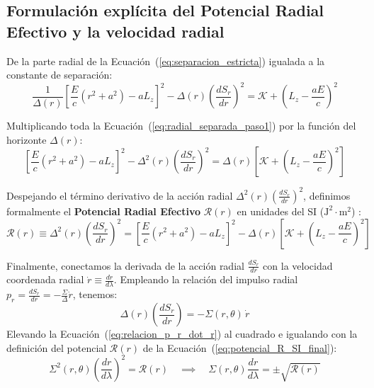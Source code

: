 \subsection{Formulación explícita del Potencial Radial Efectivo y la velocidad radial}

De la parte radial de la Ecuación~(\ref{eq:separacion_estricta}) igualada a la constante de separación:
\begin{equation}
    \frac{1}{\Delta(r)} \left[ \frac{E}{c}(r^2+a^2) - a L_z \right]^2 - \Delta(r) \left(\frac{dS_r}{dr}\right)^2 = \mathcal{K} + \left(L_z - \frac{a E}{c}\right)^2
    \label{eq:radial_separada_paso1}
\end{equation}

Multiplicando toda la Ecuación~(\ref{eq:radial_separada_paso1}) por la función del horizonte $\Delta(r)$:
\begin{equation}
    \left[ \frac{E}{c}(r^2+a^2) - a L_z \right]^2 - \Delta^2(r) \left(\frac{dS_r}{dr}\right)^2 = \Delta(r) \left[ \mathcal{K} + \left(L_z - \frac{a E}{c}\right)^2 \right]
    \label{eq:radial_separada_paso2}
\end{equation}

Despejando el término derivativo de la acción radial $\Delta^2(r) \left(\frac{dS_r}{dr}\right)^2$, definimos formalmente el \textbf{Potencial Radial Efectivo} $\mathcal{R}(r)$ en unidades del SI ($\text{J}^2\cdot\text{m}^2$) \citep{1403.5234v2, Kobialko2024}:
\begin{equation}
    \mathcal{R}(r) \equiv \Delta^2(r) \left(\frac{dS_r}{dr}\right)^2 = \left[ \frac{E}{c}(r^2+a^2) - a L_z \right]^2 - \Delta(r) \left[ \mathcal{K} + \left(L_z - \frac{a E}{c}\right)^2 \right]
    \label{eq:potencial_R_SI_final}
\end{equation}

Finalmente, conectamos la derivada de la acción radial $\frac{dS_r}{dr}$ con la velocidad coordenada radial $\dot{r} \equiv \frac{dr}{d\lambda}$. Empleando la relación del impulso radial $p_r = \frac{dS_r}{dr} = -\frac{\Sigma}{\Delta} \dot{r}$, tenemos:
\begin{equation}
    \Delta(r) \left(\frac{dS_r}{dr}\right) = -\Sigma(r,\theta) \, \dot{r}
    \label{eq:relacion_p_r_dot_r}
\end{equation}
Elevando la Ecuación~(\ref{eq:relacion_p_r_dot_r}) al cuadrado e igualando con la definición del potencial $\mathcal{R}(r)$ de la Ecuación~(\ref{eq:potencial_R_SI_final}):
\begin{equation}
    \Sigma^2(r,\theta) \left( \frac{dr}{d\lambda} \right)^2 = \mathcal{R}(r) \quad \implies \quad \Sigma(r,\theta) \frac{dr}{d\lambda} = \pm \sqrt{\mathcal{R}(r)}
    \label{eq:ecuacion_movimiento_r_final}
\end{equation}





